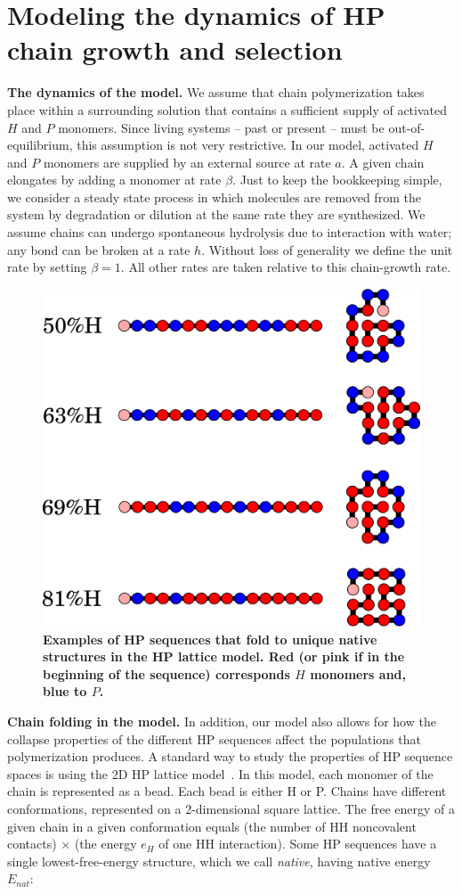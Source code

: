 \documentclass[twocolumn,letterpaper]{revtex4-1}
\begin{document}
\section*{Modeling the dynamics of HP chain growth and selection}
 
 \textbf{The dynamics of the model.}  We assume that chain polymerization takes place within a 
surrounding solution that contains a sufficient supply of activated $H$ and $P$ monomers.  Since 
living systems -- past or present -- must be out-of-equilibrium, this 
assumption is not very restrictive.  In our model, activated $H$ and $P$ monomers are supplied by 
an external source at rate $a$.  A given chain elongates by adding a monomer at rate $\beta$.  
Just 
to keep the bookkeeping simple, we consider a steady state process in which molecules are removed 
from the system by degradation or dilution at the same rate they are 
synthesized.  We assume chains can undergo spontaneous hydrolysis due to interaction with water; 
any bond can be broken at a rate $h$. Without loss of generality we define the unit rate by 
setting 
$\beta = 1$.  All other rates are taken relative to this chain-growth rate.
 
 \begin{figure}[ht!]
  \centering
  \includegraphics[width=0.8\columnwidth]{pictures/tst-seqs.eps} 
  \caption{\footnotesize{\bf{Examples of HP sequences that fold to unique native structures in the 
HP lattice model.} Red (or pink if in the beginning of the sequence) corresponds $H$ monomers and, 
blue to $P$.}}
  \label{fig:hydro-effect}
\end{figure}
 \textbf{Chain folding in the model.}  In addition, our model also allows for how the collapse 
properties of the different HP sequences affect the populations that polymerization produces.  A 
standard way to study the properties of HP sequence spaces is using the 2D HP lattice 
model~\cite{lau1989lattice,Chan1991}.  In this model, each monomer of the chain is represented as 
a 
bead.  Each bead is either H or P.  Chains have different conformations, represented on a 
2-dimensional square lattice.  The free energy of a given chain in a given conformation equals 
(the 
number of HH noncovalent contacts) $\times$ (the energy $e_H$ of one HH interaction).  Some HP 
sequences have a single lowest-free-energy structure, which we call \emph{native}, having native 
energy $E_{nat}$:
\end{document}
